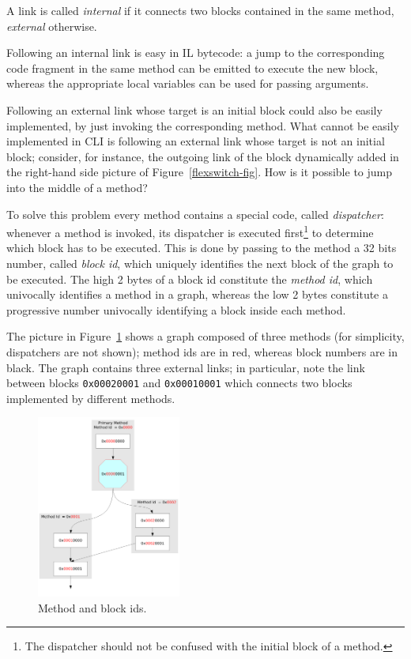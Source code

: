 A link is called \emph{internal} if it connects two blocks contained
in the same method,
\emph{external} otherwise.

Following an internal link is easy in IL bytecode: a jump to
the corresponding code fragment in the same method can be emitted 
to execute the new block, whereas the appropriate local variables can be
used for passing arguments. 

Following an external link whose target is an initial block could also
be easily implemented, by just invoking the corresponding method.
What cannot be easily implemented in CLI is following an external link
whose target is not an initial block; consider, for instance, the
outgoing link of the block dynamically added in the right-hand side
picture of Figure~\ref{flexswitch-fig}. How is it possible to jump into
the middle of a method?

To solve this problem every method contains a special code, called
\emph{dispatcher}: whenever a method is invoked, its dispatcher is
executed first\footnote{The dispatcher should not be
confused with the initial block of a method.} to
determine which block has to be executed.
This is done by passing to the method a 32 bits number, called 
\emph{block id}, which uniquely identifies the next block of the graph to be executed.
The high 2 bytes of a block id constitute the \emph{method id}, which 
univocally identifies a method in a graph, whereas the low 2 bytes constitute
a progressive number univocally identifying a block inside each method.

The picture in Figure~\ref{block-id-fig} shows a graph composed of three methods (for
simplicity, dispatchers are not shown); method ids are in red, whereas
block numbers are in black. 
The graph contains three external links; in particular, note the link
between blocks \texttt{0x00020001} and \texttt{0x00010001} which
connects two blocks implemented by different methods.
\begin{figure}[h]
\begin{center}
\includegraphics[height=6cm]{blockid}
\caption{Method and block ids.}\label{block-id-fig}
\end{center}
\end{figure}

